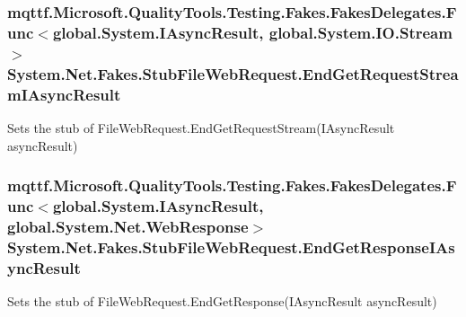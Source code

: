 \hypertarget{class_system_1_1_net_1_1_fakes_1_1_stub_file_web_request_a6ff8b8b7411bb3741d9344237319b792}{
\subsubsection[{End\-Get\-Request\-Stream\-I\-Async\-Result}]{\setlength{\rightskip}{0pt plus 5cm}mqttf.\-Microsoft.\-Quality\-Tools.\-Testing.\-Fakes.\-Fakes\-Delegates.\-Func$<$global.\-System.\-I\-Async\-Result, global.\-System.\-I\-O.\-Stream$>$ System.\-Net.\-Fakes.\-Stub\-File\-Web\-Request.\-End\-Get\-Request\-Stream\-I\-Async\-Result}}\label{class_system_1_1_net_1_1_fakes_1_1_stub_file_web_request_a6ff8b8b7411bb3741d9344237319b792}


Sets the stub of File\-Web\-Request.\-End\-Get\-Request\-Stream(\-I\-Async\-Result async\-Result)

\hypertarget{class_system_1_1_net_1_1_fakes_1_1_stub_file_web_request_a2a431d0aed7c466e77180dc22a9f993e}{
\subsubsection[{End\-Get\-Response\-I\-Async\-Result}]{\setlength{\rightskip}{0pt plus 5cm}mqttf.\-Microsoft.\-Quality\-Tools.\-Testing.\-Fakes.\-Fakes\-Delegates.\-Func$<$global.\-System.\-I\-Async\-Result, global.\-System.\-Net.\-Web\-Response$>$ System.\-Net.\-Fakes.\-Stub\-File\-Web\-Request.\-End\-Get\-Response\-I\-Async\-Result}}\label{class_system_1_1_net_1_1_fakes_1_1_stub_file_web_request_a2a431d0aed7c466e77180dc22a9f993e}


Sets the stub of File\-Web\-Request.\-End\-Get\-Response(\-I\-Async\-Result async\-Result)

